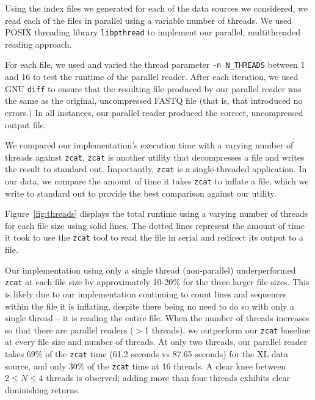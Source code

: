Using the index files we generated for each of the data sources we considered,
we read each of the files in parallel using a variable number of threads. We
used POSIX threading library \texttt{libpthread} to implement our parallel,
multithreaded reading approach.

For each file, we used \ireader and varied the thread parameter \texttt{-n
N\_THREADS} between 1 and 16 to test the runtime of the parallel reader. After
each iteration, we used GNU \texttt{diff} to ensure that the resulting file
produced by our parallel reader was the same as the original, uncompressed FASTQ
file (that is, that \ireader introduced no errors.) In all instances, our
parallel reader produced the correct, uncompressed output file.

We compared our \ireader implementation's execution time with a varying number
of threads against \texttt{zcat}. \texttt{zcat} is another \zlib utility that
decompresses a \gzip file and writes the result to standard out. Importantly,
\texttt{zcat} is a single-threaded application. In our data, we compare the
amount of time it takes \texttt{zcat} to inflate a file, which we write to
standard out to provide the best comparison against our \ireader utility.

Figure~\ref{fig:threads} displays the total \ireader runtime using a varying
number of threads for each file size using solid lines. The dotted lines
represent the amount of time it took to use the \texttt{zcat} tool to read the
file in serial and redirect its output to a file.

Our \ireader implementation using only a single thread (non-parallel) underperformed
\texttt{zcat} at each file size by approximately 10-20\% for the three larger
file sizes. This is likely due to our implementation continuing to count lines
and sequences within the \gzip file it is inflating, despite there being no need
to do so with only a single thread -- it is reading the entire file. When the
number of threads increases so that there are parallel readers ($>$1 threads),
we outperform our \texttt{zcat} baseline at every file size and number of
threads. At only two threads, our parallel reader takes 69\% of the
\texttt{zcat} time (61.2 seconds vs 87.65 seconds) for the XL data source, and
only 30\% of the \texttt{zcat} time at 16 threads. A clear knee between $2 \leq
N \leq 4$ threads is observed; adding more than four threads exhibits clear
diminishing returns. 
